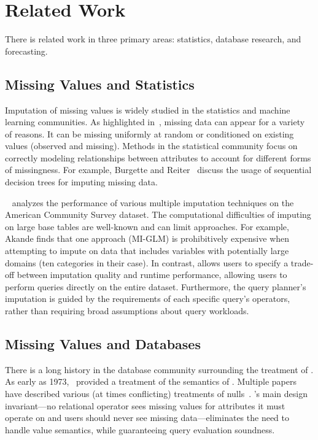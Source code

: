 \section{Related Work}

There is related work in three primary areas: statistics, database research, and forecasting.

\vspace{0.5in}
\subsection{Missing Values and Statistics}

Imputation of missing values is widely studied in the statistics and machine
learning communities. As highlighted in~\cite{gelman2006data}, missing data
can appear for a variety of reasons.
It can be missing uniformly at random or conditioned on
existing values (observed and missing). Methods in the statistical community
focus on correctly modeling relationships between attributes to account for different forms
of missingness. For example, Burgette and Reiter~\cite{burgette2010multiple} discuss the
usage of sequential decision trees
for imputing missing data.

~\cite{akande2015empirical} analyzes the performance of various
multiple imputation techniques on the American Community Survey dataset. 
The computational difficulties of imputing on large base
tables are well-known and can limit approaches. For example, Akande finds that
one approach (MI-GLM) is prohibitively expensive when attempting to impute on data that
includes variables with potentially large domains (ten categories in their case).
In contrast, \ProjectName{} allows users to specify a trade-off between
imputation quality and runtime performance, allowing users to perform queries
directly on the entire dataset. Furthermore,
the query planner's imputation is guided by the requirements of each specific
query's operators, rather than requiring broad assumptions about query
workloads.  

\subsection{Missing Values and Databases}
There is a long history in the database community surrounding the
treatment of \nullv{}. As early as 1973,~\cite{codd1973understanding}
provided a treatment of the semantics of \nullv{}. Multiple
papers have described various (at times conflicting) treatments
of nulls~\cite{grant1977null}. \ProjectName's main design invariant---no relational operator
sees missing values for attributes it must operate on and users should never see
missing data---eliminates
the need to handle \nullv{} value semantics, while guaranteeing query evaluation soundness.

